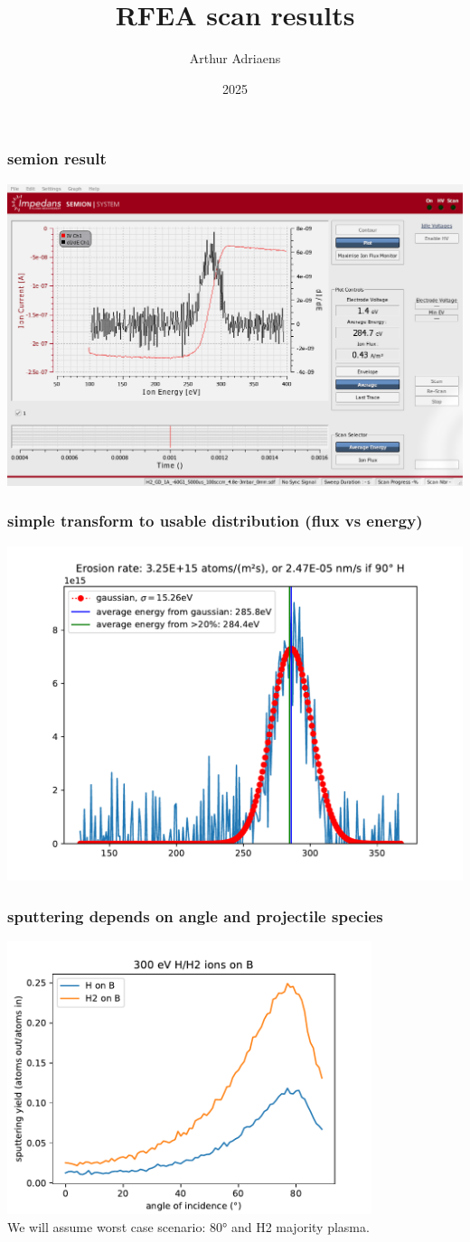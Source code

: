 \documentclass{beamer} %
\title{RFEA scan results} %
\author{Arthur Adriaens}
\date{2025}
\begin{document}
\frame{\titlepage}

\begin{frame}
    \frametitle{semion result}
    \includegraphics[width=\textwidth]{figures/semion.png}
\end{frame}
\begin{frame}
    \frametitle{simple transform to usable distribution (flux vs energy)}
    \includegraphics[width=\textwidth]{figures/ExampleIonDistribution.pdf}
\end{frame}
\begin{frame}
    \frametitle{sputtering depends on angle and projectile species}
    \includegraphics[width=0.8\textwidth]{figures/AngleDependance.pdf}\\
    We will assume worst case scenario: 80° and H2 majority plasma.
\end{frame}
\end{document}
